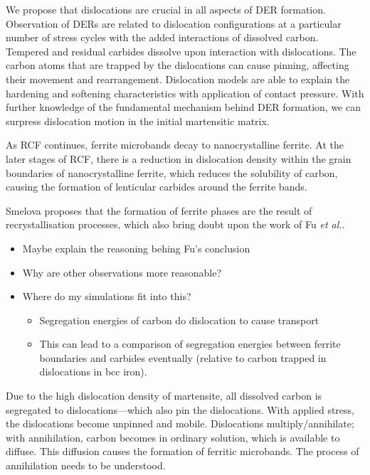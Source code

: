 \documentclass[a4paper]{article}
\begin{document}
We propose that dislocations are crucial in all aspects of DER formation. Observation of DERs are
related to dislocation configurations at a particular number of stress cycles with the added
interactions of dissolved carbon. Tempered and residual carbides dissolve upon interaction with
dislocations. The carbon atoms that are trapped by the dislocations can cause pinning, affecting their
movement and rearrangement. Dislocation models are able to explain the hardening and softening
characteristics with application of contact pressure. With further knowledge of the fundamental
mechanism behind DER formation, we can surpress dislocation motion in the initial martensitic
matrix. 

As RCF continues, ferrite microbands decay to nanocrystalline ferrite. At the later stages of RCF,
there is a reduction in dislocation density within the grain boundaries of nanocrystalline
ferrite, which reduces the solubility of carbon, causing the formation of lenticular carbides
around the ferrite bands. 

Smelova proposes that the formation of ferrite phases are the
result of recrystallisation processes, which also bring doubt upon the work of Fu \emph{et
al.}.

\begin{itemize}
\item Maybe explain the reasoning behing Fu's conclusion
\item Why are other observations more reasonable?
\item Where do my simulations fit into this? 
\begin{itemize}
\item Segregation energies of carbon do dislocation to cause transport
\item This can lead to a comparison of segregation energies between ferrite boundaries and carbides
eventually (relative to carbon trapped in dislocations in bcc iron).
\end{itemize}
\end{itemize}




Due to the high dislocation density of martensite, all dissolved
carbon is segregated to dislocations---which also pin the
dislocations. With applied stress, the dislocations become unpinned
and mobile. Dislocations multiply/annihilate; with annihilation,
carbon becomes in ordinary solution, which is available to
diffuse. This diffusion causes the formation of ferritic
microbands. The process of annihilation needs to be understood. 
\end{document}
